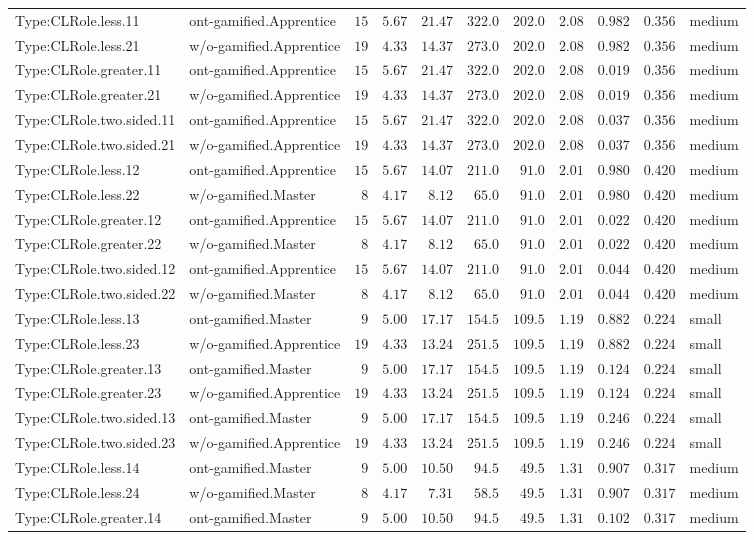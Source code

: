 \documentclass[6pt,a4paper]{article}
\begin{document}
{\begin{longtable}{llrrrrrrrrl}
Type:CLRole.less.11&ont-gamified.Apprentice&$15$&$5.67$&$21.47$&$322.0$&$202.0$&$2.08$&$0.982$&$0.356$&medium\tabularnewline
Type:CLRole.less.21&w/o-gamified.Apprentice&$19$&$4.33$&$14.37$&$273.0$&$202.0$&$2.08$&$0.982$&$0.356$&medium\tabularnewline
Type:CLRole.greater.11&ont-gamified.Apprentice&$15$&$5.67$&$21.47$&$322.0$&$202.0$&$2.08$&$0.019$&$0.356$&medium\tabularnewline
Type:CLRole.greater.21&w/o-gamified.Apprentice&$19$&$4.33$&$14.37$&$273.0$&$202.0$&$2.08$&$0.019$&$0.356$&medium\tabularnewline
Type:CLRole.two.sided.11&ont-gamified.Apprentice&$15$&$5.67$&$21.47$&$322.0$&$202.0$&$2.08$&$0.037$&$0.356$&medium\tabularnewline
Type:CLRole.two.sided.21&w/o-gamified.Apprentice&$19$&$4.33$&$14.37$&$273.0$&$202.0$&$2.08$&$0.037$&$0.356$&medium\tabularnewline
Type:CLRole.less.12&ont-gamified.Apprentice&$15$&$5.67$&$14.07$&$211.0$&$ 91.0$&$2.01$&$0.980$&$0.420$&medium\tabularnewline
Type:CLRole.less.22&w/o-gamified.Master&$ 8$&$4.17$&$ 8.12$&$ 65.0$&$ 91.0$&$2.01$&$0.980$&$0.420$&medium\tabularnewline
Type:CLRole.greater.12&ont-gamified.Apprentice&$15$&$5.67$&$14.07$&$211.0$&$ 91.0$&$2.01$&$0.022$&$0.420$&medium\tabularnewline
Type:CLRole.greater.22&w/o-gamified.Master&$ 8$&$4.17$&$ 8.12$&$ 65.0$&$ 91.0$&$2.01$&$0.022$&$0.420$&medium\tabularnewline
Type:CLRole.two.sided.12&ont-gamified.Apprentice&$15$&$5.67$&$14.07$&$211.0$&$ 91.0$&$2.01$&$0.044$&$0.420$&medium\tabularnewline
Type:CLRole.two.sided.22&w/o-gamified.Master&$ 8$&$4.17$&$ 8.12$&$ 65.0$&$ 91.0$&$2.01$&$0.044$&$0.420$&medium\tabularnewline
Type:CLRole.less.13&ont-gamified.Master&$ 9$&$5.00$&$17.17$&$154.5$&$109.5$&$1.19$&$0.882$&$0.224$&small\tabularnewline
Type:CLRole.less.23&w/o-gamified.Apprentice&$19$&$4.33$&$13.24$&$251.5$&$109.5$&$1.19$&$0.882$&$0.224$&small\tabularnewline
Type:CLRole.greater.13&ont-gamified.Master&$ 9$&$5.00$&$17.17$&$154.5$&$109.5$&$1.19$&$0.124$&$0.224$&small\tabularnewline
Type:CLRole.greater.23&w/o-gamified.Apprentice&$19$&$4.33$&$13.24$&$251.5$&$109.5$&$1.19$&$0.124$&$0.224$&small\tabularnewline
Type:CLRole.two.sided.13&ont-gamified.Master&$ 9$&$5.00$&$17.17$&$154.5$&$109.5$&$1.19$&$0.246$&$0.224$&small\tabularnewline
Type:CLRole.two.sided.23&w/o-gamified.Apprentice&$19$&$4.33$&$13.24$&$251.5$&$109.5$&$1.19$&$0.246$&$0.224$&small\tabularnewline
Type:CLRole.less.14&ont-gamified.Master&$ 9$&$5.00$&$10.50$&$ 94.5$&$ 49.5$&$1.31$&$0.907$&$0.317$&medium\tabularnewline
Type:CLRole.less.24&w/o-gamified.Master&$ 8$&$4.17$&$ 7.31$&$ 58.5$&$ 49.5$&$1.31$&$0.907$&$0.317$&medium\tabularnewline
Type:CLRole.greater.14&ont-gamified.Master&$ 9$&$5.00$&$10.50$&$ 94.5$&$ 49.5$&$1.31$&$0.102$&$0.317$&medium\tabularnewline

\end{longtable}}
\end{document}

